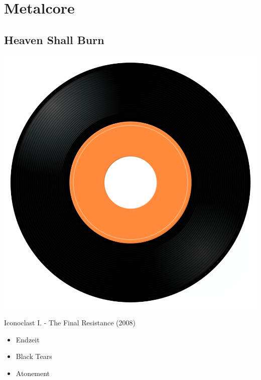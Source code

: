 \newpage

\section{Metalcore}


\subsection{Heaven Shall Burn}

\begin{minipage}[t]{0.25\textwidth}
\captionsetup{type=figure}
\includegraphics[width=\textwidth]{Images/cover.png}
\caption*{Iconoclast I. - The Final Resistance (2008)}
\end{minipage}
\begin{minipage}[t]{0.25\textwidth}\vspace{0pt}
\begin{itemize}[nosep,leftmargin=1em,labelwidth=*,align=left]
	\setlength{\itemsep}{0pt}
	\item Endzeit
	\item Black Tears
	\item Atonement
\end{itemize}
\end{minipage}

